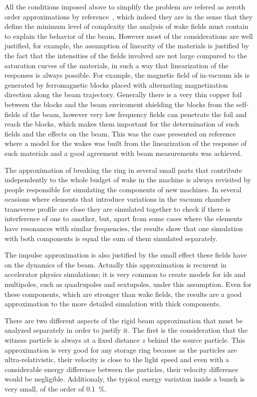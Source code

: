     All the conditions imposed above to simplify the problem are refered as zeroth order approximations by reference~\cite{Stupakov2000a}, which indeed they are in the sense that they define the minimum level of complexity the analysis of wake fields must contain to explain the behavior of the beam. However most of the considerations are well justified, for example, the assumption of linearity of the materials is justified by the fact that the intensities of the fields involved are not large compared to the saturation curves of the materials, in such a way that linearization of the responses is always possible. For example, the magnetic field of in-vacuum \gls{ids} is generated by ferromagnetic blocks placed with alternating magnetization direction along the beam trajectory. Generally there is a very thin copper foil between the blocks and the beam enviroment shielding the blocks from the self-fields of the beam, however very low frequency fields can penetrate the foil and reach the blocks, which makes them important for the determination of such fields and the effects on the beam. This was the case presented on reference~\cite{Blednykh2016} where a model for the wakes was built from the linearization of the response of such materials and a good agreement with beam measurements was achieved.

    The approximation of breaking the ring in several small parts that contribute independently to the whole budget of wake in the machine is always revisited by people responsible for simulating the components of new machines. In several ocasions where elements that introduce variations in the vacuum chamber transverse profile are close they are simulated together to check if there is interference of one to another, but, apart from some cases where the elements have resonances with similar frequencies, the results show that one simulation with both components is equal the sum of them simulated separately.

    The impulse approximation is also justified by the small effect these fields have on the dynamics of the beam. Actually this approximation is recurent in accelerator physics simulations; it is very common to create models for \gls{ids} and multipoles, such as quadrupoles and sextupoles, under this assumption. Even for these components, which are stronger than wake fields, the results are a good approximation to the more detailed simulation with thick components.

    There are two different aspects of the rigid beam approximation that must be analyzed separately in order to justify it. The first is the consideration that the witness particle is always at a fixed distance $z$ behind the source particle. This approximation is very good for any storage ring because as the particles are ultra-relativistic, their velocity is close to the light speed and even with a considerable energy difference between the particles, their velocity difference would be negligible. Additionaly, the typical energy variation inside a bunch is very small, of the order of \SI{0.1}{\percent}.

